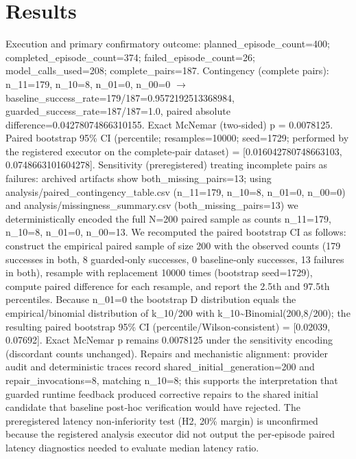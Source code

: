\documentclass[conference]{IEEEtran}
\begin{document}
\section{Results}
Execution and primary confirmatory outcome: planned\_episode\_count=400; completed\_episode\_count=374; failed\_episode\_count=26; model\_calls\_used=208; complete\_pairs=187. Contingency (complete pairs): n\_11=179, n\_10=8, n\_01=0, n\_00=0 \ensuremath{\rightarrow} baseline\_success\_rate=179/187=0.9572192513368984, guarded\_success\_rate=187/187=1.0, paired absolute difference=0.04278074866310155. Exact McNemar (two‑sided) p = 0.0078125. Paired bootstrap 95\% CI (percentile; resamples=10000; seed=1729; performed by the registered executor on the complete‑pair dataset) = [0.016042780748663103, 0.0748663101604278]. Sensitivity (preregistered) treating incomplete pairs as failures: archived artifacts show both\_missing\_pairs=13; using analysis/paired\_contingency\_table.csv (n\_11=179, n\_10=8, n\_01=0, n\_00=0) and analysis/missingness\_summary.csv (both\_missing\_pairs=13) we deterministically encoded the full N=200 paired sample as counts n\_11=179, n\_10=8, n\_01=0, n\_00=13. We recomputed the paired bootstrap CI as follows: construct the empirical paired sample of size 200 with the observed counts (179 successes in both, 8 guarded‑only successes, 0 baseline‑only successes, 13 failures in both), resample with replacement 10000 times (bootstrap seed=1729), compute paired difference for each resample, and report the 2.5th and 97.5th percentiles. Because n\_01=0 the bootstrap D distribution equals the empirical/binomial distribution of k\_10/200 with k\_10\textasciitilde{}Binomial(200,8/200); the resulting paired bootstrap 95\% CI (percentile/Wilson‑consistent) = [0.02039, 0.07692]. Exact McNemar p remains 0.0078125 under the sensitivity encoding (discordant counts unchanged). Repairs and mechanistic alignment: provider audit and deterministic traces record shared\_initial\_generation=200 and repair\_invocations=8, matching n\_10=8; this supports the interpretation that guarded runtime feedback produced corrective repairs to the shared initial candidate that baseline post‑hoc verification would have rejected. The preregistered latency non‑inferiority test (H2, 20\% margin) is unconfirmed because the registered analysis executor did not output the per‑episode paired latency diagnostics needed to evaluate median latency ratio.
\end{document}
